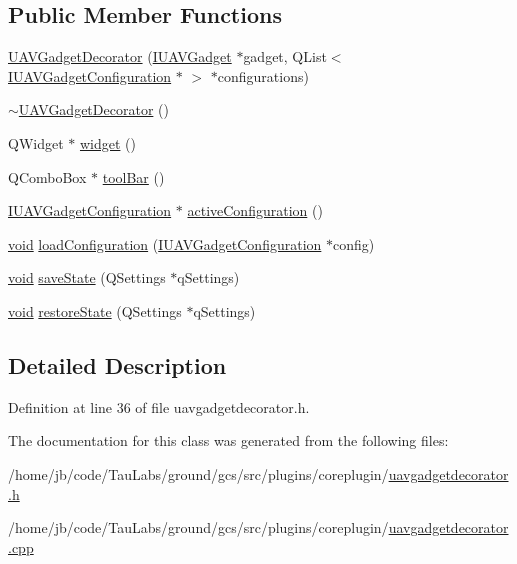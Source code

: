 \subsection*{\-Public \-Member \-Functions}
\begin{DoxyCompactItemize}
\item 
\hyperlink{group___core_plugin_gac6e67785f34247cf49bcd7887544e794}{\-U\-A\-V\-Gadget\-Decorator} (\hyperlink{class_core_1_1_i_u_a_v_gadget}{\-I\-U\-A\-V\-Gadget} $\ast$gadget, \-Q\-List$<$ \hyperlink{class_core_1_1_i_u_a_v_gadget_configuration}{\-I\-U\-A\-V\-Gadget\-Configuration} $\ast$ $>$ $\ast$configurations)
\item 
\hyperlink{group___core_plugin_ga2ece0a42a537670450430731ea9a1d20}{$\sim$\-U\-A\-V\-Gadget\-Decorator} ()
\item 
\-Q\-Widget $\ast$ \hyperlink{group___core_plugin_ga12c4f62b462010a4f8075426f3df13bc}{widget} ()
\item 
\-Q\-Combo\-Box $\ast$ \hyperlink{group___core_plugin_ga8c9668cf01fa97af0f95ab606ff46ec5}{tool\-Bar} ()
\item 
\hyperlink{class_core_1_1_i_u_a_v_gadget_configuration}{\-I\-U\-A\-V\-Gadget\-Configuration} $\ast$ \hyperlink{group___core_plugin_ga8df27a3c2e778b33daa795e69b087119}{active\-Configuration} ()
\item 
\hyperlink{group___u_a_v_objects_plugin_ga444cf2ff3f0ecbe028adce838d373f5c}{void} \hyperlink{group___core_plugin_ga2cb86d2fb668e30c63e1438984b7ec76}{load\-Configuration} (\hyperlink{class_core_1_1_i_u_a_v_gadget_configuration}{\-I\-U\-A\-V\-Gadget\-Configuration} $\ast$config)
\item 
\hyperlink{group___u_a_v_objects_plugin_ga444cf2ff3f0ecbe028adce838d373f5c}{void} \hyperlink{group___core_plugin_gac05eb0306b2ea9df605c375ec35826d3}{save\-State} (\-Q\-Settings $\ast$q\-Settings)
\item 
\hyperlink{group___u_a_v_objects_plugin_ga444cf2ff3f0ecbe028adce838d373f5c}{void} \hyperlink{group___core_plugin_ga13653640feaa74b1fec61e88c82406ae}{restore\-State} (\-Q\-Settings $\ast$q\-Settings)
\end{DoxyCompactItemize}


\subsection{\-Detailed \-Description}


\-Definition at line 36 of file uavgadgetdecorator.\-h.



\-The documentation for this class was generated from the following files\-:\begin{DoxyCompactItemize}
\item 
/home/jb/code/\-Tau\-Labs/ground/gcs/src/plugins/coreplugin/\hyperlink{uavgadgetdecorator_8h}{uavgadgetdecorator.\-h}\item 
/home/jb/code/\-Tau\-Labs/ground/gcs/src/plugins/coreplugin/\hyperlink{uavgadgetdecorator_8cpp}{uavgadgetdecorator.\-cpp}\end{DoxyCompactItemize}
